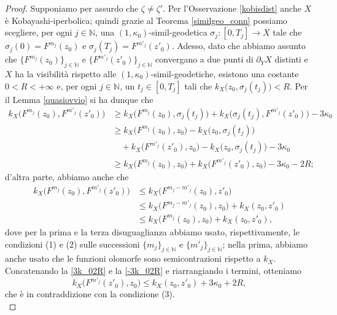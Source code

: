 \begin{proof}
    Supponiamo per assurdo che $\zeta\not=\zeta'$. Per l'Osservazione \ref{kobisdist} anche $X$ è Kobayashi-iperbolica; quindi grazie al Teorema \ref{similgeo_conn} possiamo scegliere, per ogni $j\in\mathbb{N}$, una $(1,\kappa_0)$-simil-geodetica $\sigma_j:[0,T_j] \longrightarrow X$ tale che $\sigma_j(0)=F^{m_j}(z_0)$ e $\sigma_j(T_j)=F^{m'_j}(z'_0)$. Adesso, dato che abbiamo assunto che $\{F^{m_j}(z_0)\}_{j\in\mathbb{N}}$ e $\{F^{m'_j}(z'_0)\}_{j\in\mathbb{N}}$ convergano a due punti di $\partial_YX$ distinti e $X$ ha la visibilità rispetto alle $(1,\kappa_0)$-simil-geodetiche, esistono una costante $0<R<+\infty$ e, per ogni $j\in\mathbb{N}$, un $t_j\in[0,T_j]$ tali che $k_X\big(z_0,\sigma_j(t_j)\big)<R$. Per il Lemma \ref{quasiovvio} si ha dunque che
    \begin{equation} \label{3k_02R}
        \begin{aligned}
            k_X\big(F^{m_j}(z_0),F^{m'_j}(z'_0)\big) &\ge k_X\big(F^{m_j}(z_0),\sigma_j(t_j)\big)+k_X\big(\sigma_j(t_j),F^{m'_j}(z'_0)\big)-3\kappa_0\\
            &\ge k_X\big(F^{m_j}(z_0),z_0\big)-k_X\big(z_0,\sigma_j(t_j)\big)\\
            &\quad+k_X\big(F^{m'_j}(z'_0),z_0\big)-k_X\big(z_0,\sigma_j(t_j)\big)-3\kappa_0\\
            &\ge k_X\big(F^{m_j}(z_0),z_0\big)+k_X\big(F^{m'_j}(z'_0),z_0\big)-3\kappa_0-2R;
        \end{aligned}
    \end{equation}
    d'altra parte, abbiamo anche che
    \begin{equation} \label{-3k_02R}
        \begin{aligned}
            k_X\big(F^{m_j}(z_0),F^{m'_j}(z'_0)\big) &\le k_X\big(F^{m_j-m'_j}(z_0),z'_0\big) \\
            &\le k_X\big(F^{m_j-m'_j}(z_0),z_0\big)+k_X(z_0,z'_0) \\
            &\le k_X\big(F^{m_j}(z_0),z_0\big)+k_X(z_0,z'_0),
        \end{aligned}
    \end{equation}
    dove per la prima e la terza disuguaglianza abbiamo usato, rispettivamente, le condizioni (1) e (2) sulle successioni $\{m_j\}_{j\in\mathbb{N}}$ e $\{m'_j\}_{j\in\mathbb{N}}$; nella prima, abbiamo anche usato che le funzioni olomorfe sono semicontrazioni rispetto a $k_X$. Concatenando la \eqref{3k_02R} e la \eqref{-3k_02R} e riarrangiando i termini, otteniamo
    $$k_X\big(F^{m'_j}(z'_0),z_0\big) \le k_X(z_0,z'_0)+3\kappa_0+2R,$$
    che è in contraddizione con la condizione (3).\\


\end{proof}
